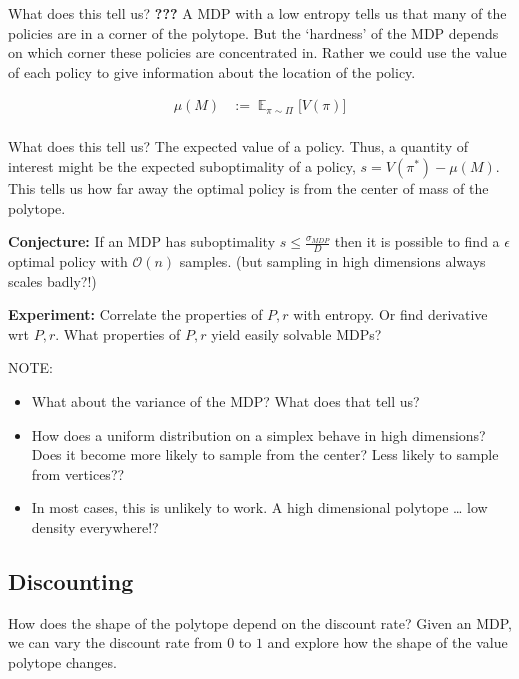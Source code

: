 What does this tell us? \textbf{???} A MDP with a low entropy tells us
that many of the policies are in a corner of the polytope. But the
`hardness' of the MDP depends on which corner these policies are
concentrated in. Rather we could use the value of each policy to give
information about the location of the policy.

\begin{align*}
\mu(M) &:= \mathop{\mathbb E}_{\pi\sim\Pi}\Big[V(\pi) \Big]\\
\end{align*}

What does this tell us? The expected value of a policy. Thus, a quantity
of interest might be the expected suboptimality of a policy,
\(s = V(\pi^{* })-\mu(M)\). This tells us how far away the optimal
policy is from the center of mass of the polytope.

\textbf{Conjecture:} If an MDP has suboptimality
\(s \le \frac{\sigma_{MDP}}{D}\) then it is possible to find a
\(\epsilon\) optimal policy with \(\mathcal O(n)\) samples. (but
sampling in high dimensions always scales badly?!)

\textbf{Experiment:} Correlate the properties of \(P, r\) with entropy.
Or find derivative wrt \(P, r\). What properties of \(P, r\) yield
easily solvable MDPs?

NOTE:

\begin{itemize}
\item
  What about the variance of the MDP? What does that tell us?
\item
  How does a uniform distribution on a simplex behave in high
  dimensions? Does it become more likely to sample from the center? Less
  likely to sample from vertices??
\item
  In most cases, this is unlikely to work. A high dimensional polytope
  \ldots{} low density everywhere!?
\end{itemize}


\subsection{Discounting}

How does the shape of the polytope depend on the discount rate? Given an
MDP, we can vary the discount rate from \(0\) to \(1\) and explore how
the shape of the value polytope changes.

